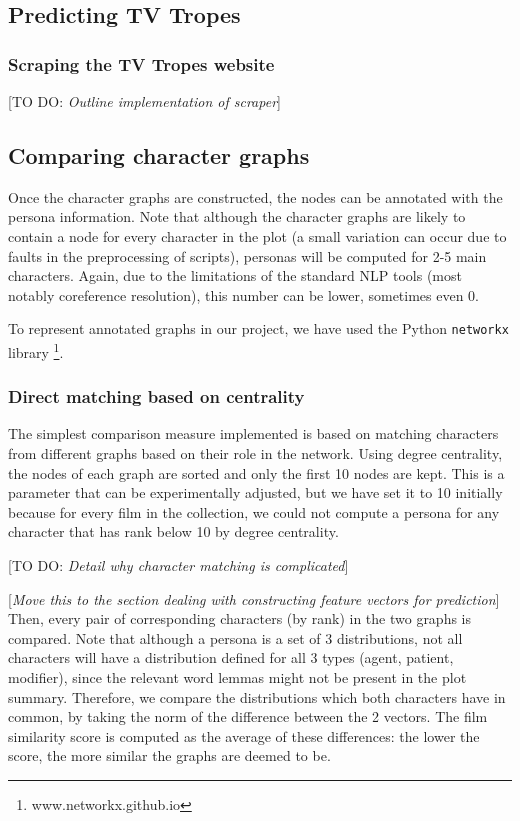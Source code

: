 \documentclass[bsc,frontabs,singlespacing,parskip]{infthesis} %
\begin{document}
\subsection{Predicting TV Tropes}
\subsubsection{Scraping the TV Tropes website}
[TO DO: \textit{Outline implementation of scraper}]

\subsection{Comparing character graphs}
Once the character graphs are constructed, the nodes can be annotated with the persona information. Note that although the character graphs are likely to contain a node for every character in the plot (a small variation can occur due to faults in the preprocessing of scripts), personas will be computed for 2-5 main characters. Again, due to the limitations of the standard NLP tools (most notably coreference resolution), this number can be lower, sometimes even 0.

To represent annotated graphs in our project, we have used the Python \texttt{networkx} library \footnote{www.networkx.github.io}.

\subsubsection{Direct matching based on centrality}
The simplest comparison measure implemented is based on matching characters from different graphs based on their role in the network. Using degree centrality, the nodes of each graph are sorted and only the first 10 nodes are kept. This is a parameter that can be experimentally adjusted, but we have set it to 10 initially because for every film in the collection, we could not compute a persona for any character that has rank below 10 by degree centrality.

[TO DO: \textit{Detail why character matching is complicated}]

[\textit{Move this to the section dealing with constructing feature vectors for prediction}] Then, every pair of corresponding characters (by rank) in the two graphs is compared. Note that although a persona is a set of 3 distributions, not all characters will have a distribution defined for all 3 types (agent, patient, modifier), since the relevant word lemmas might not be present in the plot summary. Therefore, we compare the distributions which both characters have in common, by taking the norm of the difference between the 2 vectors. The film similarity score is computed as the average of these differences: the lower the score, the more similar the graphs are deemed to be.
\end{document}
